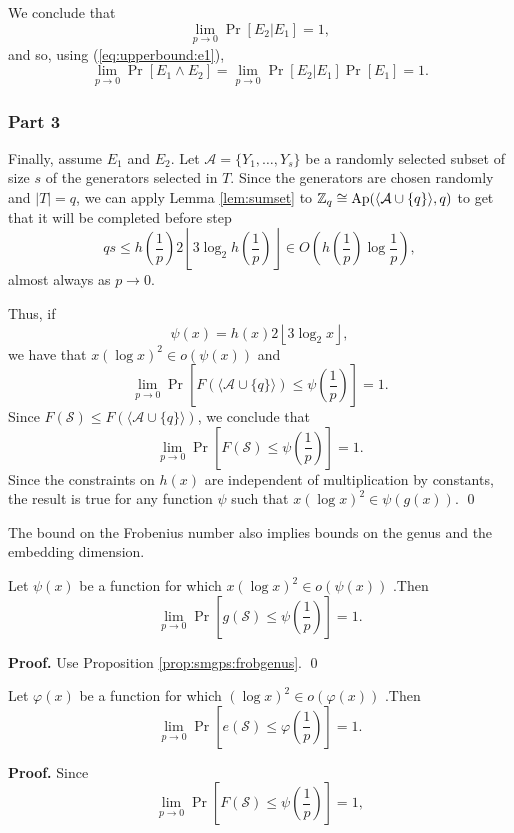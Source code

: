 \par We conclude that
\[\lim_{p \to 0} \Pr[E_2 | E_1] = 1,\]
and so, using (\ref{eq:upperbound:e1}),
\[\lim_{p \to 0} \Pr[E_1 \land E_2] = \lim_{p \to 0} \Pr[E_2  | E_1]\Pr[E_1] = 1.\]


\subsubsection*{Part 3}

\par Finally, assume $E_1$ and $E_2$. Let $\mathcal{A} = \{Y_{1}, \ldots, Y_{s}\}$ be a randomly selected subset of size $s$ of the generators selected in $T$.  Since the generators are chosen randomly and $|T| = q$, we can apply Lemma \ref{lem:sumset} to $\mathbb{Z}_q \cong \mathrm{Ap}(\langle\mathcal{A}\cup\{q\}\rangle, q)$ to get that it will be completed before step \[ qs\leq h\left(\frac{1}{p}\right)2\left\lfloor 3\log_2 h\left(\frac{1}{p}\right)\right\rfloor \in O\left(h\left(\frac{1}{p}\right)\log \frac{1}{p}\right),\]
almost always as $p \to 0$. 
\par Thus, if
\[\psi(x) = h\left(x\right)2\left\lfloor 3\log_2 x\right\rfloor,\]
we have that $x(\log x)^2 \in o(\psi(x))$ and
\[\lim_{p \to  0} \Pr\left[F(\langle\mathcal{A}\cup \{q\}\rangle) \leq \psi\left(\frac{1}{p}\right)\right] = 1.\]
Since $F(\mathcal{S}) \leq F(\langle \mathcal{A}\cup\{q\}\rangle)$, we conclude that
\[\lim_{p \to 0}\Pr\left[F(\mathcal{S}) \leq \psi\left(\frac{1}{p}\right)\right] = 1.\]
Since the constraints on $h(x)$ are independent of multiplication by constants, the result is true for any function $\psi$ such that $x(\log x)^2 \in \psi(g(x))$. \qed \par
The bound on the Frobenius number also implies bounds on the genus and the embedding dimension.
\begin{corollary}
    Let $\psi(x)$ be a function for which $x(\log x)^2 \in o(\psi(x))$ .Then
    \[\lim_{p \to 0}\Pr\left[g(\mathcal{S}) \leq \psi\left(\frac{1}{p}\right)\right] = 1.\]
\end{corollary}
\textbf{Proof. } Use Proposition \ref{prop:smgps:frobgenus}. \qed
\begin{corollary}
    Let $\varphi(x)$ be a function for which $(\log x)^2 \in o(\varphi(x))$ .Then
    \[\lim_{p \to 0}\Pr\left[e(\mathcal{S}) \leq \varphi\left(\frac{1}{p}\right)\right] = 1.\]
\end{corollary}
\textbf{Proof. } Since
\[\lim_{p \to 0}\Pr\left[F(\mathcal{S}) \leq \psi\left(\frac{1}{p}\right)\right] = 1,\]
